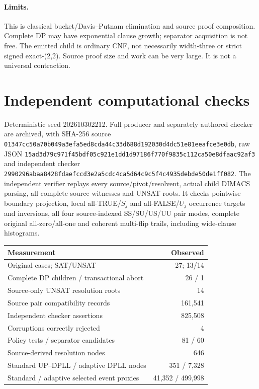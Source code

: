 \documentclass[11pt]{article}
\begin{document}
\paragraph{Limits.} This is classical bucket/Davis--Putnam elimination and source proof composition. Complete DP may have exponential clause growth; separator acquisition is not free. The emitted child is ordinary CNF, not necessarily width-three or strict signed exact-(2,2). Source proof size and work can be very large. It is not a universal contraction.
\section{Independent computational checks}
Deterministic seed 202610302212. Full producer and separately authored checker are archived, with SHA-256 source \texttt{01347cc50a70b049a3efa5ed8cda44c33d688d192030d4dc51e81eeafce3e0db}, raw JSON \texttt{15ad3d79c971f45bdf05c921e1dd1d97186f770f9835c112ca50e8dfaac92af3} and independent checker \texttt{2990296abaa8428fdaefccd3e2a5cdc4ca5d64c9c5f4c4935debde50de1ff082}. The independent verifier replays every source/pivot/resolvent, actual child DIMACS parsing, all complete source witnesses and UNSAT roots. It checks pointwise boundary projection, local all-TRUE/$S_j$ and all-FALSE/$U_j$ occurrence targets and inversions, all four source-indexed SS/SU/US/UU pair modes, complete original all-zero/all-one and coherent multi-flip trails, including wide-clause histograms.
\begin{center}\begin{tabular}{lr}\toprule
Measurement&Observed\\\midrule
Original cases; SAT/UNSAT&27; 13/14\\
Complete DP children / transactional abort&26 / 1\\
Source-only UNSAT resolution roots&14\\
Source pair compatibility records&161,541\\
Independent checker assertions&825,508\\
Corruptions correctly rejected&4\\
Policy tests / separator candidates&81 / 60\\
Source-derived resolution nodes&646\\
Standard UP--DPLL / adaptive DPLL nodes&351 / 7,328\\
Standard / adaptive selected event proxies&41,352 / 499,998\\\bottomrule
\end{tabular}\end{center}
\end{document}
